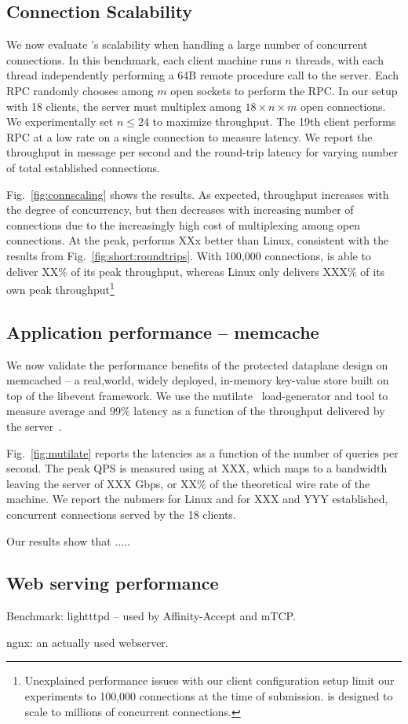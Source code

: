 \subsection{Connection Scalability}


\label{sec:eval:scale}

We now evaluate \ix's scalability when handling a large number of
concurrent connections. In this benchmark, each client machine runs
$n$ threads, with each thread independently performing a 64B remote
procedure call to the server.  Each RPC randomly chooses among $m$
open sockets to perform the RPC.  In our setup with 18 clients, the
server must multiplex among $18 \times n \times m$ open connections.
We experimentally set $n \leq 24$ to maximize throughput.  The 19th
client performs RPC at a low rate on a single connection to measure
latency.  We report the throughput in message per second and the
round-trip latency for varying number of total established connections.

Fig.~\ref{fig:connscaling} shows the results.  As expected, throughput
increases with the degree of concurrency, but then decreases with
increasing number of connections due to the increasingly high cost of
multiplexing among open connections.  At the peak, \ix performs XXx
better than Linux, consistent with the results from
Fig.~\ref{fig:short:roundtrips}.  With 100,000 connections, \ix is
able to deliver XX\% of its peak throughput, whereas Linux only
delivers XXX\% of its own peak throughput\footnote{Unexplained
  performance issues with our client configuration setup limit our
  experiments to 100,000 connections at the time of submission. \ix is
  designed to scale to millions of concurrent connections.}


\subsection{Application performance -- memcache}
\label{sec:eval:memcache}



We now validate the performance benefits of the protected dataplane
design on memcached -- a real,world, widely deployed, in-memory
key-value store built on top of the libevent framework.  We use the
mutilate~\cite{misc:mutilate} load-generator and tool to measure
average and 99\% latency as a function of the throughput delivered by
the server~\cite{Leverich:RHSU:2014}.

Fig.~\ref{fig:mutilate} reports the latencies as a function of the
number of queries per second.  The peak QPS is measured using \ix at
XXX, which maps to a bandwidth leaving the server of XXX Gbps, or XX\%
of the theoretical wire rate of the machine.  We report the nubmers
for Linux and \ix for XXX and YYY established, concurrent
connections served by the 18 clients.

Our results show that .....

\subsection{Web serving performance}


\todo Benchmark: lightttpd -- used by Affinity-Accept and mTCP.  

\todo ngnx: an actually used webserver.



%
